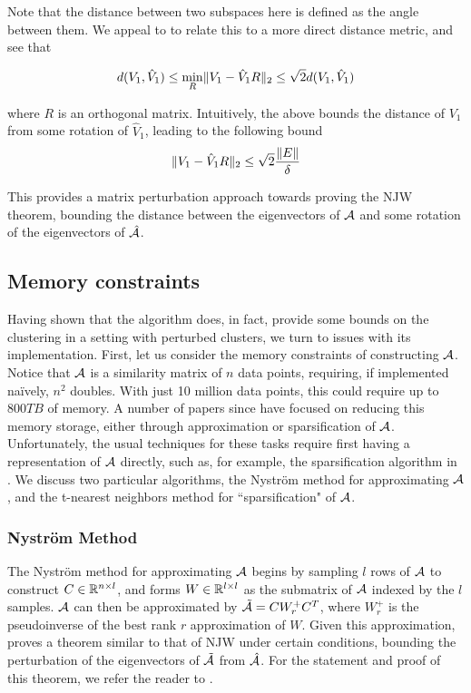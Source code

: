 Note that the distance between two subspaces here is defined as the angle
between them. We appeal to \cite{ee381vlec6} to relate this to
a more direct distance metric, and see that

\[ d(V_1, \hat{V}_1) \leq \min_{R} \lVert V_1 - \hat{V}_1R\rVert_2 \leq \sqrt{2} d(V_1, \hat{V}_1) \]

where $R$ is an orthogonal matrix. Intuitively, the above bounds the distance
of $V_1$ from some rotation of $\hat{V}_1$, leading to the following bound
\[ \lVert V_1 - \hat{V}_1R\rVert_2 \leq \sqrt{2} \frac{\lVert E\rVert}{\delta} \]

This provides a matrix perturbation approach towards proving the NJW theorem,
bounding the distance between the eigenvectors of $\mathcal{A}$ and some rotation of
the eigenvectors of $\hat{\mathcal{A}}$.

\subsection{Memory constraints}
Having shown that the algorithm does, in fact, provide some bounds on the
clustering in a setting with perturbed clusters, we turn to issues with its
implementation. First, let us consider the memory constraints of constructing
$\mathcal{A}$. Notice that $\mathcal{A}$ is a similarity matrix of $n$ data points, requiring,
if implemented na\"{i}vely, $n^2$ doubles. With just 10 million data points,
this could require up to $800 TB$ of memory. A number of papers since have
focused on reducing this memory storage, either through approximation or
sparsification of $\mathcal{A}$. Unfortunately, the usual techniques for these tasks
require first having a representation of $\mathcal{A}$ directly, such as, for example,
the sparsification algorithm in \cite{spielman2011graph}. We discuss two
particular algorithms, the Nystr\"{o}m method for approximating $\mathcal{A}$, and the
t-nearest neighbors method for ``sparsification" of $\mathcal{A}$.

\subsubsection{Nystr\"{o}m Method}
The Nystr\"{o}m method for approximating $\mathcal{A}$ begins by sampling $l$ rows
of $\mathcal{A}$ to construct $C \in \mathbb{R}^{n \times l}$, and forms $W \in \mathbb{R}^{l \times l}$
as the submatrix of $\mathcal{A}$ indexed by the $l$ samples. $\mathcal{A}$ can then be
approximated by $\tilde{\mathcal{A}} = C W_r^+ C^T$, where $W_r^+$ is the pseudoinverse
of the best rank $r$ approximation of $W$. Given this approximation,
\cite{choromanska2013fast} proves a theorem similar to that of NJW under
certain conditions, bounding the perturbation of the eigenvectors of
$\tilde{\mathcal{A}}$ from $\hat{\mathcal{A}}$. For the statement and proof of this theorem, we
refer the reader to \cite{choromanska2013fast}.

